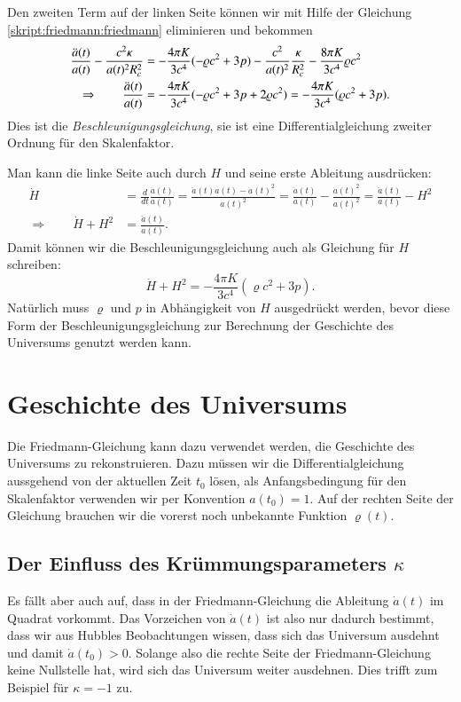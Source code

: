 Den zweiten Term auf der linken Seite können wir mit Hilfe der Gleichung
\eqref{skript:friedmann:friedmann}
eliminieren und bekommen
\begin{align}
\frac{\ddot a(t)}{a(t)}
-
\frac{c^2\kappa }{a(t)^2R_c^2}
&=
-\frac{4\pi K}{3c^4}(-\varrho c^2 + 3p)
-\frac{c^2}{a(t)^2}\frac{\kappa }{R_c^2}
-\frac{8\pi K}{3c^4}\varrho c^2
\notag
\\
\Rightarrow\qquad
\frac{\ddot a(t)}{a(t)}
&=
-\frac{4\pi K}{3c^4}(-\varrho c^2 + 3p + 2 \varrho c^2)
=
-\frac{4\pi K}{3c^4}(\varrho c^2 + 3p).
\label{skript:friedmann:beschleunigung}
\end{align}
Dies ist die {\em Beschleunigungsgleichung}, sie ist eine
Differentialgleichung zweiter Ordnung für den Skalenfaktor.
%

Man kann die linke Seite auch durch $H$ und seine erste Ableitung
ausdrücken:
\begin{align*}
\dot H
&=
\frac{d}{dt}\frac{\dot a(t)}{a(t)}
=
\frac{\ddot a(t) a(t)-\dot a(t)^2}{a(t)^2}
=
\frac{\ddot a(t)}{a(t)} - \frac{\dot a(t)^2}{a(t)^2}
=
\frac{\ddot a(t)}{a(t)} - H^2
\\
\Rightarrow
\qquad
\dot H+H^2
&=
\frac{\ddot a(t)}{a(t)}.
\end{align*}
Damit können wir die Beschleunigungsgleichung auch als Gleichung
für $H$ schreiben:
\begin{equation}
\dot H+H^2
=
-\frac{4\pi K}{3c^4}(\varrho c^2 + 3p).
\end{equation}
Natürlich muss $\varrho$ und $p$ in Abhängigkeit von $H$ ausgedrückt
werden, bevor diese Form der Beschleunigungsgleichung zur Berechnung
der Geschichte des Universums genutzt werden kann.

\section{Geschichte des Universums}
Die Friedmann-Gleichung kann dazu verwendet werden, die Geschichte
des Universums zu rekonstruieren.
Dazu müssen wir die Differentialgleichung aussgehend von der
aktuellen Zeit $t_0$ lösen, als Anfangsbedingung für den
Skalenfaktor verwenden wir per Konvention $a(t_0)=1$.
Auf der rechten Seite der Gleichung brauchen wir die vorerst noch
unbekannte Funktion $\varrho(t)$.

\subsection{Der Einfluss des Krümmungsparameters $\kappa$}
Es fällt aber auch auf, dass in der Friedmann-Gleichung die Ableitung
$\dot a(t)$ im Quadrat vorkommt.
Das Vorzeichen von $\dot a(t)$ ist also nur dadurch bestimmt, dass
wir aus Hubbles Beobachtungen wissen, dass sich das Universum
ausdehnt und damit $\dot a(t_0) > 0$.
Solange also die rechte Seite der Friedmann-Gleichung keine Nullstelle
hat, wird sich das Universum weiter ausdehnen.
Dies trifft zum Beispiel für $\kappa=-1$ zu.

